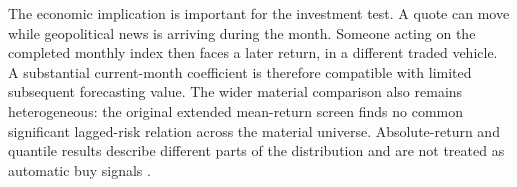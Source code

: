 
The economic implication is important for the investment test. A quote can move while geopolitical news is arriving during the month. Someone acting on the completed monthly index then faces a later return, in a different traded vehicle. A substantial current-month coefficient is therefore compatible with limited subsequent forecasting value. The wider material comparison also remains heterogeneous: the original extended mean-return screen finds no common significant lagged-risk relation across the material universe. Absolute-return and quantile results describe different parts of the distribution and are not treated as automatic buy signals \citep{koenker1978}.
